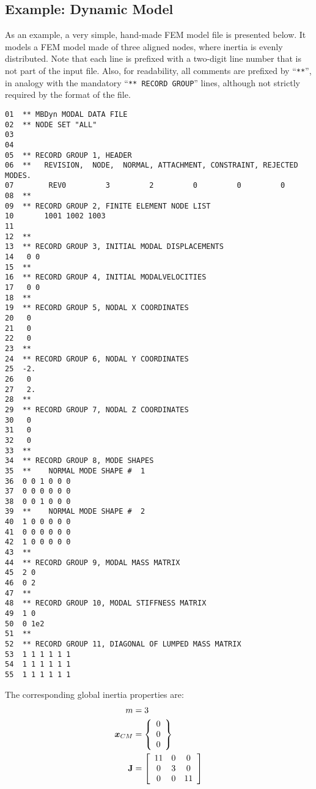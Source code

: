\subsection{Example: Dynamic Model}
\label{sec:APP:EL:STRUCT:JOINT:MODAL:DYNAMIC-MODEL}
As an example, a very simple, hand-made FEM model file is presented below.
It models a FEM model made of three aligned nodes, where inertia 
is evenly distributed.
Note that each line is prefixed with a two-digit line number 
that is not part of the input file.
Also, for readability, all comments are prefixed by ``\texttt{**}'', in analogy
with the mandatory ``\texttt{** RECORD GROUP}'' lines, although not strictly
required by the format of the file.

{\small
\begin{verbatim}
01  ** MBDyn MODAL DATA FILE
02  ** NODE SET "ALL" 
03    
04    
05  ** RECORD GROUP 1, HEADER
06  **   REVISION,  NODE,  NORMAL, ATTACHMENT, CONSTRAINT, REJECTED MODES.
07        REV0         3         2         0         0         0
08  **
09  ** RECORD GROUP 2, FINITE ELEMENT NODE LIST
10       1001 1002 1003
11  
12  **
13  ** RECORD GROUP 3, INITIAL MODAL DISPLACEMENTS
14   0 0
15  **
16  ** RECORD GROUP 4, INITIAL MODALVELOCITIES
17   0 0
18  **
19  ** RECORD GROUP 5, NODAL X COORDINATES
20   0
21   0
22   0
23  **
24  ** RECORD GROUP 6, NODAL Y COORDINATES
25  -2.
26   0
27   2.
28  **
29  ** RECORD GROUP 7, NODAL Z COORDINATES
30   0
31   0
32   0
33  **
34  ** RECORD GROUP 8, MODE SHAPES
35  **    NORMAL MODE SHAPE #  1
36  0 0 1 0 0 0
37  0 0 0 0 0 0
38  0 0 1 0 0 0
39  **    NORMAL MODE SHAPE #  2
40  1 0 0 0 0 0
41  0 0 0 0 0 0
42  1 0 0 0 0 0
43  **
44  ** RECORD GROUP 9, MODAL MASS MATRIX
45  2 0
46  0 2
47  **
48  ** RECORD GROUP 10, MODAL STIFFNESS MATRIX
49  1 0
50  0 1e2
51  **
52  ** RECORD GROUP 11, DIAGONAL OF LUMPED MASS MATRIX
53  1 1 1 1 1 1
54  1 1 1 1 1 1
55  1 1 1 1 1 1
\end{verbatim}
}

The corresponding global inertia properties are:
\begin{align}
	m		&= 3 \\
	\T{x}_{CM}	&= \cubr{\cvvect{
		0 \\
		0 \\
		0
	}} \\
	\TT{J}		&= \sqbr{\matr{ccc}{
		11 &  0 &  0 \\
		 0 &  3 &  0 \\
		 0 &  0 & 11
	}}
\end{align}


